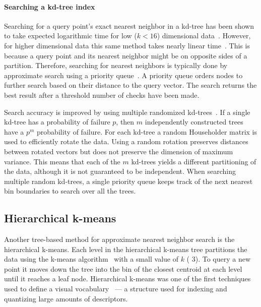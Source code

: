         \paragraph{Searching a kd-tree index}
        Searching for a query point's exact nearest neighbor in a kd-tree has been shown to take expected
        logarithmic time for low ($k < 16$) dimensional data~\cite{friedman_algorithm_1977}. However, for higher
        dimensional data this same method takes nearly linear time~\cite{sproull_refinements_1991}. This is because
        a query point and its nearest neighbor might be on opposite sides of a partition. Therefore, searching for
        nearest neighbors is typically done by approximate search using a priority queue~\cite{beis_shape_1997}. A
        priority queue orders nodes to further search based on their distance to the query vector. The search
        returns the best result after a threshold number of checks have been made. %

        Search accuracy is improved by using multiple randomized kd-trees~\cite{silpa_anan_optimised_2008}. If a
        single kd-tree has a probability of failure $p$, then $m$ independently constructed trees have a $p^m$
        probability of failure. For each kd-tree a random Householder matrix is used to efficiently rotate the
        data. Using a random rotation preserves distances between rotated vectors but does not preserve the
        dimension of maximum variance. This means that each of the $m$ kd-trees yields a different partitioning of
        the data, although it is not guaranteed to be independent. When searching multiple random kd-trees, a
        single priority queue keeps track of the next nearest bin boundaries to search over all the trees.

    \subsection{Hierarchical k-means}
        Another tree-based method for approximate nearest neighbor search is the hierarchical k-means. Each level
        in the hierarchical k-means tree partitions the data using the k-means algorithm~\cite{lloyd_least_1982}
        with a small value of $k$ (\eg{} 3). To query a new point it moves down the tree into the bin of the
        closest centroid at each level until it reaches a leaf node. Hierarchical k-means was one of the first
        techniques used to define a visual vocabulary~\cite{nister_scalable_2006} --- a structure used for indexing
        and quantizing large amounts of descriptors.
    
